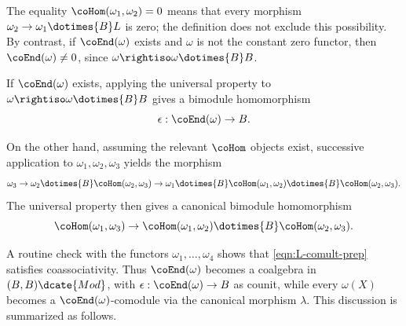 \begin{remark}
	The equality $\coHom(\omega_1,\omega_2)=0$ means that every morphism
	$\omega_2\to\omega_1\dotimes{B}L$ is zero; the definition does not exclude
	this possibility. By contrast, if $\coEnd(\omega)$ exists and $\omega$ is
	not the constant zero functor, then $\coEnd(\omega)\neq0$, since
	$\omega\rightiso\omega\dotimes{B}B$.
\end{remark}

If $\coEnd(\omega)$ exists, applying the universal property to
$\omega\rightiso\omega\dotimes{B}B$ gives a bimodule homomorphism
\[ \epsilon: \coEnd(\omega) \to B. \]

On the other hand, assuming the relevant $\coHom$ objects exist, successive
application to $\omega_1,\omega_2,\omega_3$ yields the morphism
\begin{equation*}
	\omega_3 \to \omega_2 \dotimes{B} \coHom(\omega_2, \omega_3) \to \omega_1 \dotimes{B} \coHom(\omega_1, \omega_2) \dotimes{B} \coHom(\omega_2, \omega_3).
\end{equation*}
The universal property then gives a canonical bimodule homomorphism
\begin{equation}\label{eqn:L-comult-prep}
	\coHom(\omega_1, \omega_3) \to \coHom(\omega_1, \omega_2) \dotimes{B} \coHom(\omega_2, \omega_3).
\end{equation}

A routine check with the functors $\omega_1,\ldots,\omega_4$ shows that
\eqref{eqn:L-comult-prep} satisfies coassociativity. Thus $\coEnd(\omega)$
becomes a coalgebra in $(B,B)\dcate{Mod}$, with
$\epsilon:\coEnd(\omega)\to B$ as counit, while every $\omega(X)$ becomes a
$\coEnd(\omega)$-comodule via the canonical morphism $\lambda$. This
discussion is summarized as follows.

